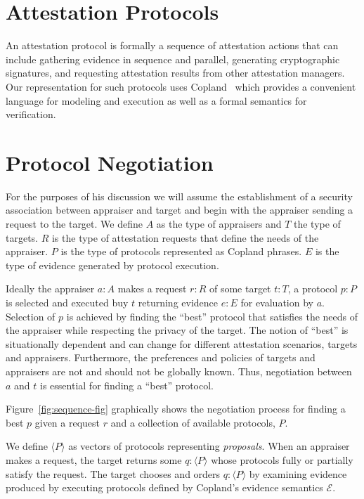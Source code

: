 \documentclass[sigconf,authordraft]{acmart}
\begin{document}
\section{Attestation Protocols}

An attestation protocol is formally a sequence of attestation actions
that can include gathering evidence in sequence and parallel,
generating cryptographic signatures, and requesting attestation
results from other attestation managers.  Our representation for such
protocols uses Copland~\citep{Ramsdell:2019aa} which provides a
convenient language for modeling and execution as well as a formal
semantics for verification.


\section{Protocol Negotiation}

For the purposes of his discussion we will assume the establishment of
a security association between appraiser and target and begin with the
appraiser sending a request to the target.  We define $A$ as the type
of appraisers and $T$ the type of targets.  $R$ is the type of
attestation requests that define the needs of the appraiser.  $P$ is
the type of protocols represented as Copland phrases.  $E$ is the type
of evidence generated by protocol execution.

Ideally the appraiser $a:A$ makes a request $r:R$ of some target
$t:T$, a protocol $p:P$ is selected and executed buy $t$ returning
evidence $e:E$ for evaluation by $a$.  Selection of $p$ is achieved by
finding the ``best'' protocol that satisfies the needs of the
appraiser while respecting the privacy of the target. The notion of
``best'' is situationally dependent and can change for different
attestation scenarios, targets and appraisers.  Furthermore, the
preferences and policies of targets and appraisers are not and should
not be globally known.  Thus, negotiation between $a$ and $t$ is
essential for finding a ``best'' protocol.  

Figure~\ref{fig:sequence-fig} graphically shows the negotiation
process for finding a best $p$ given a request $r$ and a collection of
available protocols, $P$.

We define $\langle P \rangle$ as vectors of protocols
representing \emph{proposals}.  When an appraiser makes a request,
the target returns some $q:\langle P \rangle$ whose protocols fully or
partially satisfy the request. The target chooses and orders
$q:\langle P\rangle$ by examining evidence produced by executing
protocols defined by Copland's evidence semantics $\mathcal{E}$.
\end{document}
